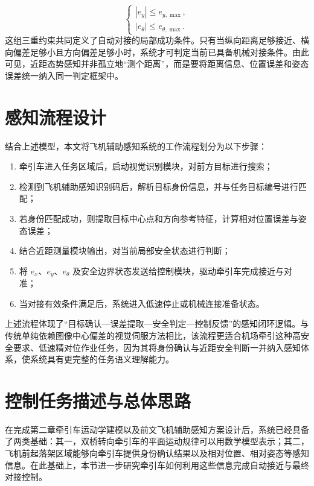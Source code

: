 \begin{equation}
\begin{cases}
|e_y|\leq e_{y,\max},\\
|e_\theta|\leq e_{\theta,\max}.
\end{cases}
\label{eq:docking_condition}
\end{equation}
这组三重约束共同定义了自动对接的局部成功条件。只有当纵向距离足够接近、横向偏差足够小且方向偏差足够小时，系统才可判定当前已具备机械对接条件。由此可见，近距态势感知并非孤立地``测个距离''，而是要将距离信息、位置误差和姿态误差统一纳入同一判定框架中。

\section{感知流程设计}

结合上述模型，本文将飞机辅助感知系统的工作流程划分为以下步骤：
\begin{enumerate}[label=（\arabic*）,leftmargin=4em]
\item 牵引车进入任务区域后，启动视觉识别模块，对前方目标进行搜索；
\item 检测到飞机辅助感知识别码后，解析目标身份信息，并与任务目标编号进行匹配；
\item 若身份匹配成功，则提取目标中心点和方向参考特征，计算相对位置误差与姿态误差；
\item 结合近距测量模块输出，对当前局部安全状态进行判断；
\item 将 \(e_{x}\)、\(e_{y}\)、\(e_{\theta}\) 及安全边界状态发送给控制模块，驱动牵引车完成接近与对准；
\item 当对接有效条件满足后，系统进入低速停止或机械连接准备状态。
\end{enumerate}

上述流程体现了``目标确认---误差提取---安全判定---控制反馈''的感知闭环逻辑。与传统单纯依赖图像中心偏差的视觉伺服方法相比，该流程更适合机场牵引这种高安全要求、低速精对位作业任务，因为其将身份确认与近距安全判断一并纳入感知体系，使系统具有更完整的任务语义理解能力。

\section{控制任务描述与总体思路}

在完成第二章牵引车运动学建模以及前文飞机辅助感知方案设计后，系统已经具备了两类基础：其一，双桥转向牵引车的平面运动规律可以用数学模型表示；其二，飞机前起落架区域能够向牵引车提供身份确认结果以及相对位置、相对姿态等感知信息。在此基础上，本节进一步研究牵引车如何利用这些信息完成自动接近与最终对接控制。

